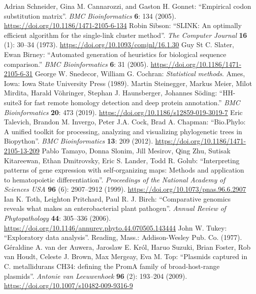 \documentclass{report}
\begin{document}
\begin{thebibliography}{99}
Adrian Schneider, Gina M. Cannarozzi, and Gaston H. Gonnet: ``Empirical codon substitution matrix''. \textit{BMC Bioinformatics} {\bf 6}: 134 (2005).
\url{https://doi.org/10.1186/1471-2105-6-134}
Robin Sibson: ``SLINK: An optimally efficient algorithm for the single-link cluster method''. \textit{The Computer Journal} {\bf 16} (1): 30--34 (1973).
\url{https://doi.org/10.1093/comjnl/16.1.30}
Guy St C. Slater, Ewan Birney: ``Automated generation of heuristics for biological sequence comparison.'' \textit{BMC Bioinformatics} {\bf 6}: 31 (2005).
\url{https://doi.org/10.1186/1471-2105-6-31}
George W. Snedecor, William G. Cochran: \textit{Statistical methods}. Ames, Iowa: Iowa State University Press (1989).
Martin Steinegger, Markus Meier, Milot Mirdita, Harald V\"ohringer, Stephan J. Haunsberger, Johannes S\"oding: ``HH-suite3 for fast remote homology detection and deep protein annotation.'' \textit{BMC Bioinformatics} {\bf 20}: 473 (2019).
\url{https://doi.org/10.1186/s12859-019-3019-7}
Eric Talevich, Brandon M. Invergo, Peter J.A. Cock, Brad A. Chapman: ``Bio.Phylo: A unified toolkit for processing, analyzing and visualizing phylogenetic trees in Biopython''. \textit{BMC Bioinformatics} {\bf 13}: 209 (2012).
\url{https://doi.org/10.1186/1471-2105-13-209}
Pablo Tamayo, Donna Slonim, Jill Mesirov, Qing Zhu, Sutisak Kitareewan, Ethan Dmitrovsky, Eric S. Lander, Todd R. Golub: ``Interpreting patterns of gene expression with self-organizing maps: Methods and application to hematopoietic differentiation''. \textit{Proceedings of the National Academy of Sciences USA} {\bf 96} (6): 2907--2912 (1999).
\url{https://doi.org/10.1073/pnas.96.6.2907}
Ian K. Toth, Leighton Pritchard, Paul R. J. Birch: ``Comparative genomics reveals what makes an enterobacterial plant pathogen''. \textit{Annual Review of Phytopathology} {\bf 44}: 305--336 (2006).
\url{https://doi.org/10.1146/annurev.phyto.44.070505.143444}
John W. Tukey: ``Exploratory data analysis''. Reading, Mass.: Addison-Wesley Pub. Co. (1977).
G\'eraldine A. van der Auwera, Jaroslaw E. Kr\'ol, Haruo Suzuki, Brian Foster, Rob van Houdt, Celeste J. Brown, Max Mergeay, Eva M. Top: ``Plasmids captured in C. metallidurans CH34: defining the PromA family of broad-host-range plasmids''.
\textit{Antonie van Leeuwenhoek} {\bf 96} (2): 193--204 (2009).
\url{https://doi.org/10.1007/s10482-009-9316-9}

\end{thebibliography}
\end{document}
